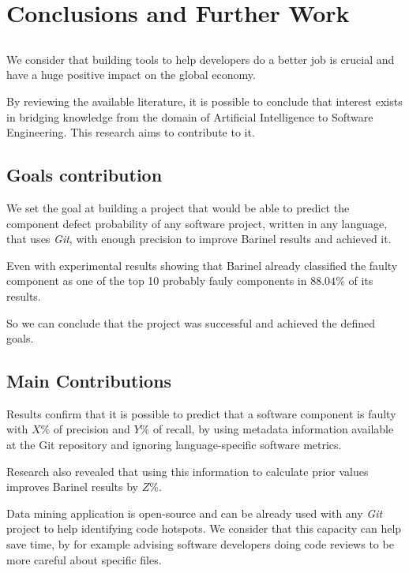 \chapter{Conclusions and Further Work} \label{chap:conclusions}

\section*{}

We consider that building tools to help developers do a better job is crucial and have a huge positive impact on the global economy. 

By reviewing the available literature, it is possible to conclude that interest exists in bridging knowledge from the domain of Artificial Intelligence to Software Engineering.
This research aims to contribute to it.

\section{Goals contribution}

We set the goal at building a project that would be able to predict the component defect probability of any software project, written in any language, that uses \emph{Git}, with enough precision to improve Barinel results and achieved it. 

Even with experimental results showing that Barinel already classified the faulty component as one of the top 10 probably fauly components in $88.04\%$ of its results. 

So we can conclude that the project was successful and achieved the defined goals.


\section{Main Contributions}

Results confirm that it is possible to predict that a software component is faulty with $X\%$ of precision and $Y\%$ of recall, by using metadata information available at the Git repository and ignoring language-specific software metrics.

Research also revealed that using this information to calculate prior values improves Barinel results by $Z\%$.

Data mining application is open-source and can be already used with any \emph{Git} project to help identifying code hotspots. We consider that this capacity can help save time, by for example advising software developers doing code reviews to be more careful about specific files.

